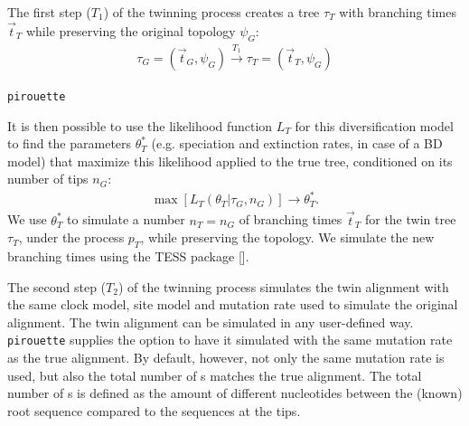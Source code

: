 The first step ($T_1$) of the twinning process creates a tree $\tau_{\mathit{T}}$
with branching times $\Vec{t}_{\mathit{T}}$ while preserving the original
topology $\psi_{\mathit{G}}$:
\begin{align}
  \tau_{\mathit{G}} = (\Vec{t}_{\mathit{G}}, \psi_{\mathit{G}}) 
  \xrightarrow[]{\mathit{T_1}} 
  \tau_{\mathit{T}} = (\Vec{t}_{\mathit{T}}, \psi_{\mathit{G}})
\end{align}

\verb;pirouette;

It is then possible to use the likelihood function 
$L_{\mathit{T}}$ for this diversification model to find 
the parameters $\theta^{*}_{\mathit{T}}$ 
(e.g. speciation and extinction rates, in case of a BD model) 
that maximize this likelihood applied 
to the true tree, conditioned on its number of tips $n_{\mathit{G}}$:
\begin{align}
    \max[L_{\mathit{T}}(\theta_{\mathit{T}}|\tau_{\mathit{G}}, n_{\mathit{G}})] 
\rightarrow \theta^{*}_{\mathit{T}}.
\end{align}
We use $\theta^{*}_{\mathit{T}}$ to simulate a number 
$n_{\mathit{T}} = n_{\mathit{G}}$ 
of branching times $\Vec{t}_{\mathit{T}}$ for the twin tree 
$\tau_{\mathit{T}}$, under the process $p_{T}$, 
while preserving the topology. 
We simulate the new branching times using the TESS 
package [\cite{TESS, hohna2016tess}].

The second step ($T_2$) of the twinning process simulates the twin alignment 
with the same clock model, site model and mutation rate 
used to simulate the original alignment. 
The twin alignment can be simulated in any user-defined way.
\verb;pirouette; supplies the option to have it simulated with
the same mutation rate as the true alignment. By default, however,
not only the same mutation rate is used, but also the total number of 
s
matches the true alignment. The total number of s is defined
as the amount of different nucleotides between the (known) root sequence
compared to the sequences at the tips.

